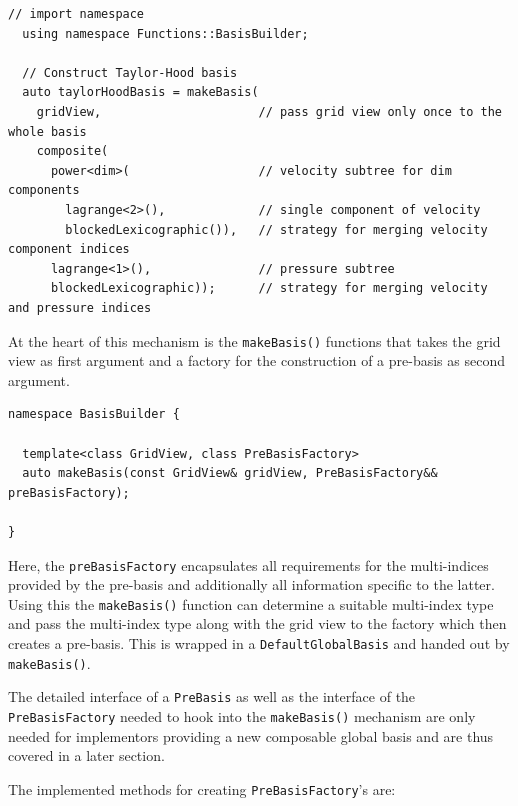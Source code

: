 \documentclass[a4paper,10pt,headings=normal,bibliography=totoc]{scrartcl}
\newcommand{\cpp}[1]{\lstinline[basicstyle=\ttfamily]!#1!}
\begin{document}
\begin{lstlisting}[style=Example]
  // import namespace
  using namespace Functions::BasisBuilder;

  // Construct Taylor-Hood basis
  auto taylorHoodBasis = makeBasis(
    gridView,                      // pass grid view only once to the whole basis
    composite(
      power<dim>(                  // velocity subtree for dim components
        lagrange<2>(),             // single component of velocity
        blockedLexicographic()),   // strategy for merging velocity component indices
      lagrange<1>(),               // pressure subtree
      blockedLexicographic));      // strategy for merging velocity and pressure indices
\end{lstlisting}

At the heart of this mechanism is the \cpp{makeBasis()} functions
that takes the grid view as first argument and a factory for the
construction of a pre-basis as second argument.

\begin{lstlisting}[style=Interface]
namespace BasisBuilder {

  template<class GridView, class PreBasisFactory>
  auto makeBasis(const GridView& gridView, PreBasisFactory&& preBasisFactory);

}
\end{lstlisting}

Here, the \cpp{preBasisFactory} encapsulates all requirements
for the multi-indices provided by the pre-basis and additionally
all information specific to the latter. Using this the \cpp{makeBasis()}
function can determine a suitable multi-index type and pass the
multi-index type along with the grid view to the factory which
then creates a pre-basis. This is wrapped in a \cpp{DefaultGlobalBasis}
and handed out by \cpp{makeBasis()}.

The detailed interface of a \cpp{PreBasis} as well as the
interface of the \cpp{PreBasisFactory} needed to hook into
the \cpp{makeBasis()} mechanism are only needed for implementors providing
a new composable global basis and are thus covered in a later section.

The implemented methods for creating \cpp{PreBasisFactory}'s are:
\end{document}
